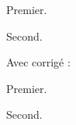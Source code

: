 \begin{exercise}
  Premier.
\end{exercise}

\begin{exercise}
  Second.
\end{exercise}

Avec corrigé :

\begin{exercisecb}
  Premier.
\end{exercisecb}
\begin{exercisecb}
  Second.
\end{exercisecb}
